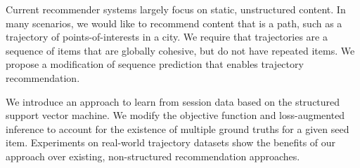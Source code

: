 
Current recommender systems largely focus on static, unstructured content.
In many scenarios, we would like to recommend content that is a path,
such as a trajectory of points-of-interests in a city.
We require that trajectories are a sequence of items that are globally cohesive, but
do not have repeated items. We propose a modification of sequence prediction
that enables trajectory recommendation.

We introduce an approach to learn from session data based on the structured support vector machine.
We modify the objective function and loss-augmented inference to account for the existence of multiple ground truths for a given seed item.
Experiments on real-world trajectory datasets show the benefits of our approach over existing, non-structured recommendation approaches.
